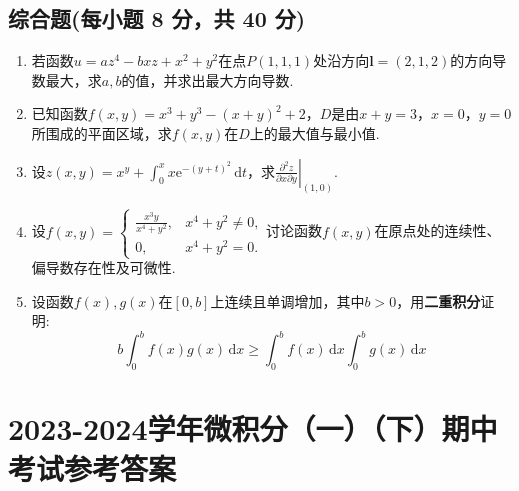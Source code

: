 \documentclass[../Main.tex]{subfiles}
\begin{document}
\section{综合题(每小题 8 分，共 40 分)}
\begin{enumerate}
    \item[11.] 若函数$u=az^{4}-bxz+x^{2}+y^{2}$在点$P(1,1,1)$处沿方向$\boldsymbol
              {l}=(2,1,2)$的方向导数最大，求$a,b$的值，并求出最大方向导数.
          \vspace{13em}

    \item[12.] 已知函数$f(x,y)=x^{3}+y^{3}-(x+y)^{2}+2$，$D$是由$x+y=3$，$x=0$，$y
              =0$所围成的平面区域，求$f(x,y)$在$D$上的最大值与最小值.
          \vspace{13em}

    \item[13.] 设$z(x,y)=x^{y}+\int_{0}^{x}x\mathrm{e}^{-(y+t)^2}\,\mathrm{d}t$，求$\left
              .\frac{\partial^{2} z}{\partial x \partial y}\right|_{(1,0)}$.
          \vspace{12em}

    \item[14.] 设$f(x,y)=
              \begin{cases}
                  \frac{x^3y}{x^4+y^2}, & x^{4}+y^{2}\neq0, \\
                  0,                    & x^{4}+y^{2}=0.
              \end{cases}$讨论函数$f(x,y)$在原点处的连续性、偏导数存在性及可微性.
          \vspace{12em}

    \item[15.] 设函数$f(x),g(x)$在$[0,b]$上连续且单调增加，其中$b>0$，用\textbf{二重积分}证明:
          \[
              b\int_{0}^{b}f(x)g(x)\,\mathrm{d}x\geq \int_{0}^{b}f(x)\,\mathrm{d}x\int_{0}^{b}
              g(x)\,\mathrm{d}x
          \]
          \vspace{10em}
\end{enumerate}

\chapter{2023-2024学年微积分（一）（下）期中考试参考答案}
\end{document}
